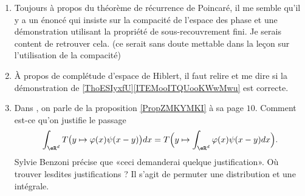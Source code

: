 \begin{enumerate}
    \item
        Toujours à propos du théorème de récurrence de Poincaré, il me semble qu'il y a un énoncé qui insiste sur la compacité de l'espace des phase et une démonstration utilisant la propriété de sous-recouvrement fini. Je serais content de retrouver cela. (ce serait sans doute mettable dans la leçon sur l'utilisation de la compacité)
    \item 
        À propos de complétude d'espace de Hiblert, il faut relire et me dire si la démonstration de \ref{ThoESIyxfU}\ref{ITEMooITQUooKWwMwu} est correcte.
        \item 
            Dans \cite{OEVAuEz}, on parle de la proposition \ref{PropZMKYMKI} à sa page \( 10\). Comment est-ce qu'on justifie le passage
            \begin{equation}
                \int_{\eR^d}T\big( y\mapsto \varphi(x)\psi(x-y) \big)dx=T\Big( y\mapsto\int_{\eR^d}\varphi(x)\psi(x-y)dx \Big).
            \end{equation}
            Sylvie Benzoni précise que «ceci demanderai quelque justification». Où trouver lesdites justifications ? Il s'agit de permuter une distribution et une intégrale.


\end{enumerate}
